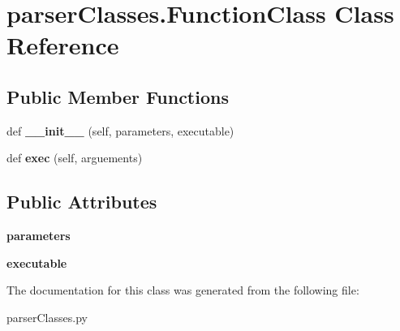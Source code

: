 \hypertarget{classparser_classes_1_1_function_class}{}\section{parser\+Classes.\+Function\+Class Class Reference}
\label{classparser_classes_1_1_function_class}
\subsection*{Public Member Functions}
\begin{DoxyCompactItemize}
\item 
\mbox{\label{classparser_classes_1_1_function_class_a3dd07341f748d2cae25c1ffbf6f3641c}} 
def {\bfseries \+\_\+\+\_\+init\+\_\+\+\_\+} (self, parameters, executable)
\item 
\mbox{\label{classparser_classes_1_1_function_class_a8d89032cea7e396eaffc98d572e737b9}} 
def {\bfseries exec} (self, arguements)
\end{DoxyCompactItemize}
\subsection*{Public Attributes}
\begin{DoxyCompactItemize}
\item 
\mbox{\label{classparser_classes_1_1_function_class_a1f37f5c3fbb128ce369287d734e5f164}} 
{\bfseries parameters}
\item 
\mbox{\label{classparser_classes_1_1_function_class_add23b914232d1773d68db10d9870d674}} 
{\bfseries executable}
\end{DoxyCompactItemize}


The documentation for this class was generated from the following file\+:\begin{DoxyCompactItemize}
\item 
parser\+Classes.\+py\end{DoxyCompactItemize}
